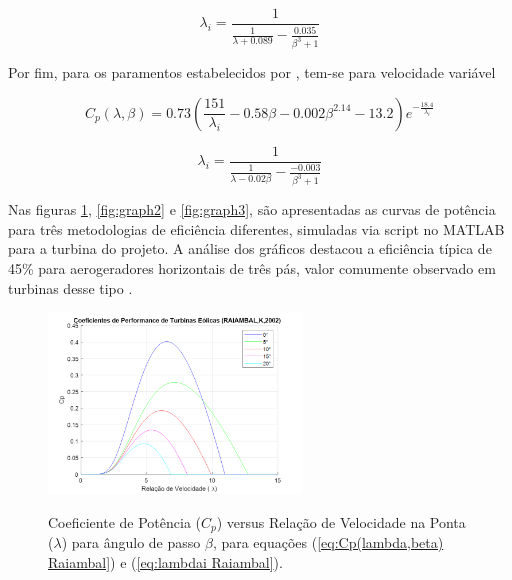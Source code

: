     \begin{equation}
        \lambda_i = \frac{1}{\frac{1}{\lambda + 0.089} -\frac{0.035}{\beta^3 + 1}}
        \label{eq:lambdai Raiambal}
    \end{equation}
     
    Por fim, para os paramentos estabelecidos por , tem-se para velocidade variável

    \begin{equation}
        C_p(\lambda, \beta) = 0.73 \left( \frac{151}{\lambda_i} - 0.58 \beta - 0.002 \beta^{2.14} - 13.2 \right) e^{-\frac{18.4}{\lambda_i}} 
        \label{eq:Cp(lambda,beta) Slootweg}
    \end{equation}
        
    \begin{equation}
        \lambda_i = \frac{1}{\frac{1}{\lambda -0.02 \beta} -\frac{-0.003}{\beta^3 + 1}}
        \label{eq:lambdai Slootweg}
    \end{equation}

    \par Nas figuras \ref{fig:graph1}, \ref{fig:graph2} e \ref{fig:graph3}, são apresentadas as curvas de potência para três metodologias de eficiência diferentes, simuladas via script no MATLAB para a turbina do projeto. A análise dos gráficos destacou a eficiência típica de 45\% para aerogeradores horizontais de três pás, valor comumente observado em turbinas desse tipo \cite{smartservo2024}.

    \begin{figure}[H]
        \centering
        \caption{Coeficiente de Potência ($C_p$) versus Relação de Velocidade na Ponta ($\lambda$) para ângulo de passo $\beta$, para equações (\ref{eq:Cp(lambda,beta) Raiambal}) e (\ref{eq:lambdai Raiambal}).}
        \includegraphics[width=0.6\textwidth]{Figuras/Teorico/graph1.png} %
        \label{fig:graph1}
    \end{figure}
    
